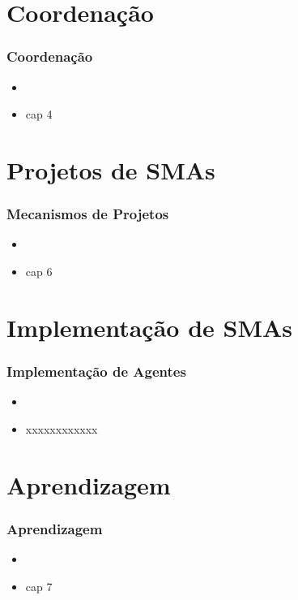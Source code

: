 \documentclass[10pt]{beamer}
\begin{document}
\section{Coordenação}
\begin{frame}

    \frametitle{Coordenação}
    \begin{itemize}
    \pause
      \item 
\pause
      \item cap 4
    
    \end{itemize}
\end{frame}


\section{Projetos de SMAs}
\begin{frame}

    \frametitle{Mecanismos de Projetos}
    \begin{itemize}
    \pause
      \item 
\pause
      \item cap 6
    
    \end{itemize}
\end{frame}




\section{Implementação de SMAs}
\begin{frame}

    \frametitle{Implementação de Agentes}
    \begin{itemize}
    \pause
      \item 
\pause
      \item xxxxxxxxxxxx
    
    \end{itemize}
\end{frame}



\section{Aprendizagem}
\begin{frame}

    \frametitle{Aprendizagem}
    \begin{itemize}
    \pause
      \item 
\pause
      \item cap 7
    
    \end{itemize}
\end{frame}
\end{document}
